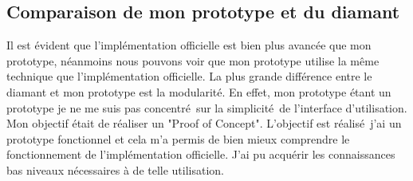 

\subsection{Comparaison de mon prototype et du diamant}

Il est évident que l'implémentation officielle est bien plus avancée que mon prototype,
néanmoins nous pouvons voir que mon prototype utilise la même technique que l'implémentation officielle.
La plus grande différence entre le diamant et mon prototype est la modularité. En effet, mon prototype étant
un prototype je ne me suis pas concentré sur la simplicité de l'interface d'utilisation. Mon objectif était 
de réaliser un "Proof of Concept". L'objectif est réalisé j'ai un prototype fonctionnel et cela m'a permis 
de bien mieux comprendre le fonctionnement de l'implémentation officielle. J'ai pu acquérir les connaissances
bas niveaux nécessaires à de telle utilisation.
